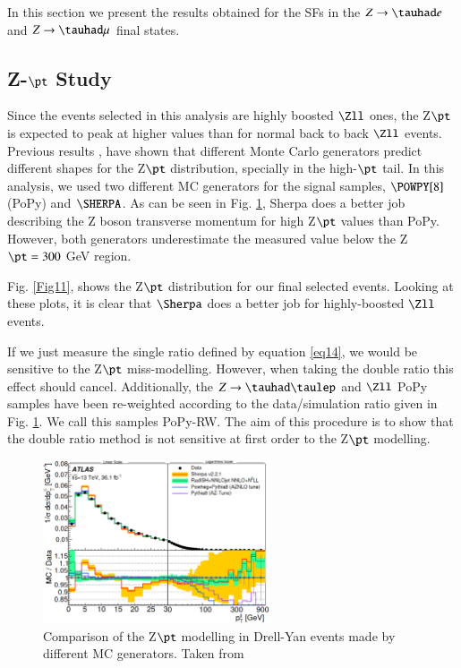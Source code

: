 In this section we present the results obtained for the SFs in the $Z\to\tauhad e$ and $Z\to\tauhad \mu$ final states. 
\subsection{Z-$\pt$ Study}
Since the events selected in this analysis are highly boosted $\Zll$ ones, the Z$\pt$ is expected to peak at higher values than for normal back to back $\Zll$ events. Previous results \cite{Aad:2019wmn}, have shown that different Monte Carlo generators predict different shapes for the Z$\pt$ distribution, specially in the high-$\pt$ tail. In this analysis, we used two different MC generators for the signal samples, $\POWPY[8]$ (PoPy) and $\SHERPA$. As can be seen in Fig. \ref{Fig10}, Sherpa does a better job describing the Z boson transverse momentum for high Z$\pt$ values than PoPy. However, both generators underestimate the measured value below the Z$\pt=300$ GeV region. 

Fig. \ref{Fig11}, shows the Z$\pt$ distribution for our final selected events. Looking at these plots, it is clear that $\Sherpa$ does a better job for highly-boosted $\Zll$ events. 

If we just measure the single ratio defined by equation \ref{eq14}, we would be sensitive to the Z$\pt$ miss-modelling. However, when taking the double ratio this effect should cancel. Additionally, the $Z\to\tauhad\taulep$ and $\Zll$ PoPy samples have been re-weighted according to the data/simulation ratio given in Fig. \ref{Fig10}. We call this samples PoPy-RW. The aim of this procedure is to show that the double ratio method is not sensitive at first order to the Z$\pt$ modelling.

\begin{figure}[htbp]
	\centering
	\includegraphics[width=0.6\textwidth]{figures/Fig10}
	\caption{Comparison of the Z$\pt$ modelling in Drell-Yan events made by different MC generators. Taken from \cite{Aad:2019wmn}}
	\label{Fig10}
\end{figure}

